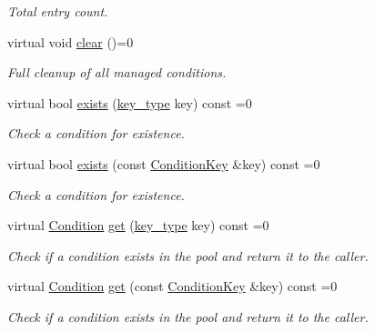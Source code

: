 \begin{DoxyCompactItemize}
\begin{DoxyCompactList}\small\item\em Total entry count. \end{DoxyCompactList}\item 
virtual void \hyperlink{class_d_d4hep_1_1_conditions_1_1_user_pool_aa1b208b96c66bee13ee9f2bd6b7aaac5}{clear} ()=0
\begin{DoxyCompactList}\small\item\em Full cleanup of all managed conditions. \end{DoxyCompactList}\item 
virtual bool \hyperlink{class_d_d4hep_1_1_conditions_1_1_user_pool_abe05e40f8f674ff18a525b27012aa8d4}{exists} (\hyperlink{class_d_d4hep_1_1_conditions_1_1_user_pool_aa256cf1e22de1b9f2a84d39309b8bfa9}{key\+\_\+type} key) const =0
\begin{DoxyCompactList}\small\item\em Check a condition for existence. \end{DoxyCompactList}\item 
virtual bool \hyperlink{class_d_d4hep_1_1_conditions_1_1_user_pool_af61d57de60db641dc8db117e2a03d3d7}{exists} (const \hyperlink{class_d_d4hep_1_1_conditions_1_1_condition_key}{Condition\+Key} \&key) const =0
\begin{DoxyCompactList}\small\item\em Check a condition for existence. \end{DoxyCompactList}\item 
virtual \hyperlink{class_d_d4hep_1_1_conditions_1_1_condition}{Condition} \hyperlink{class_d_d4hep_1_1_conditions_1_1_user_pool_ad02d5ac6dfb83a6c9fa2b7a891ecde08}{get} (\hyperlink{class_d_d4hep_1_1_conditions_1_1_user_pool_aa256cf1e22de1b9f2a84d39309b8bfa9}{key\+\_\+type} key) const =0
\begin{DoxyCompactList}\small\item\em Check if a condition exists in the pool and return it to the caller. \end{DoxyCompactList}\item 
virtual \hyperlink{class_d_d4hep_1_1_conditions_1_1_condition}{Condition} \hyperlink{class_d_d4hep_1_1_conditions_1_1_user_pool_a1b03fc2a7215f2e88739d4ecfb4f073a}{get} (const \hyperlink{class_d_d4hep_1_1_conditions_1_1_condition_key}{Condition\+Key} \&key) const =0
\begin{DoxyCompactList}\small\item\em Check if a condition exists in the pool and return it to the caller. \end{DoxyCompactList}\item 

\end{DoxyCompactItemize}
